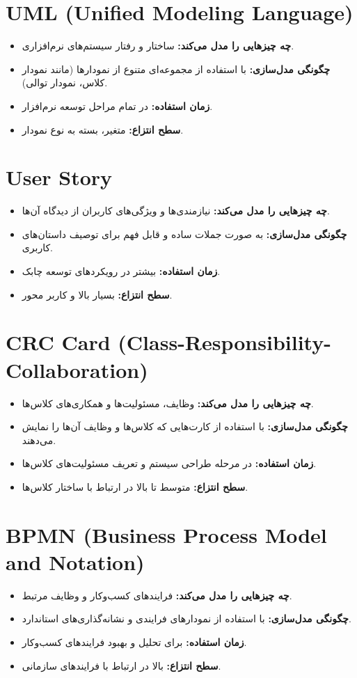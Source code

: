 \section*{UML (Unified Modeling Language)}
\begin{itemize}
	\item \textbf{چه چیزهایی را مدل می‌کند:} ساختار و رفتار سیستم‌های نرم‌افزاری.
	\item \textbf{چگونگی مدل‌سازی:} با استفاده از مجموعه‌ای متنوع از نمودارها (مانند نمودار کلاس، نمودار توالی).
	\item \textbf{زمان استفاده:} در تمام مراحل توسعه نرم‌افزار.
	\item \textbf{سطح انتزاع:} متغیر، بسته به نوع نمودار.
\end{itemize}

\section*{User Story}
\begin{itemize}
	\item \textbf{چه چیزهایی را مدل می‌کند:} نیازمندی‌ها و ویژگی‌های کاربران از دیدگاه آن‌ها.
	\item \textbf{چگونگی مدل‌سازی:} به صورت جملات ساده و قابل فهم برای توصیف داستان‌های کاربری.
	\item \textbf{زمان استفاده:} بیشتر در رویکردهای توسعه چابک.
	\item \textbf{سطح انتزاع:} بسیار بالا و کاربر محور.
\end{itemize}

\section*{CRC Card (Class-Responsibility-Collaboration)}
\begin{itemize}
	\item \textbf{چه چیزهایی را مدل می‌کند:} وظایف، مسئولیت‌ها و همکاری‌های کلاس‌ها.
	\item \textbf{چگونگی مدل‌سازی:} با استفاده از کارت‌هایی که کلاس‌ها و وظایف آن‌ها را نمایش می‌دهند.
	\item \textbf{زمان استفاده:} در مرحله طراحی سیستم و تعریف مسئولیت‌های کلاس‌ها.
	\item \textbf{سطح انتزاع:} متوسط تا بالا در ارتباط با ساختار کلاس‌ها.
\end{itemize}

\section*{BPMN (Business Process Model and Notation)}
\begin{itemize}
	\item \textbf{چه چیزهایی را مدل می‌کند:} فرایندهای کسب‌وکار و وظایف مرتبط.
	\item \textbf{چگونگی مدل‌سازی:} با استفاده از نمودارهای فرایندی و نشانه‌گذاری‌های استاندارد.
	\item \textbf{زمان استفاده:} برای تحلیل و بهبود فرایندهای کسب‌وکار.
	\item \textbf{سطح انتزاع:} بالا در ارتباط با فرایندهای سازمانی.
\end{itemize}

